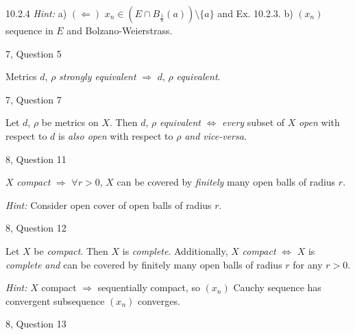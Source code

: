 \documentclass[10pt]{article} %
\newcommand{\cws}[2]{#1, Question #2}
\newcommand{\Hint}{\vspace{0.2em}\textit{Hint: }}
\begin{document}
\begin{multicols}{3}
\begin{exercise}{10.2.4}{}
    \Hint a) $(\Leftarrow)$ $x_n \in (E \cap B_{\frac{1}{n}}(a)) \setminus \{a\}$ and Ex. 10.2.3. b) $(x_n)$ sequence in $E$ and Bolzano-Weierstrass.

\end{exercise}

\begin{workshop}{\cws{7}{5}}{}

    Metrics $d$, $\rho$ \emph{strongly equivalent} $\Rightarrow$ $d$, $\rho$ \emph{equivalent}.

\end{workshop}

\begin{workshop}{\cws{7}{7}}{}

    Let $d$, $\rho$ be metrics on $X$. Then $d$, $\rho$ \emph{equivalent} $\Leftrightarrow$ \emph{every} subset of $X$ \emph{open} with respect to $d$ is \emph{also open} with respect to $\rho$ \emph{and vice-versa}.

\end{workshop}

\begin{workshop}{\cws{8}{11}}{}

    $X$ \emph{compact} $\Rightarrow$ $\forall r > 0$, $X$ can be covered by \emph{finitely} many open balls of radius $r$.

    \Hint Consider open cover of open balls of radius $r$.

\end{workshop}

\begin{workshop}{\cws{8}{12}}{}

    Let $X$ be \emph{compact}. Then $X$ is \emph{complete}. Additionally, $X$ \emph{compact} $\Leftrightarrow$ $X$ is \emph{complete} \emph{and} can be covered by finitely many open balls of radius $r$ for any $r > 0$.

    \Hint $X$ compact $\Rightarrow$ sequentially compact, so $(x_n)$ Cauchy sequence has convergent subsequence $(x_n)$ converges.

\end{workshop}

\begin{workshop}{\cws{8}{13}}{}


\end{workshop}
\end{multicols}
\end{document}
